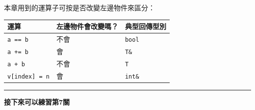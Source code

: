 \documentclass[12pt,a4paper]{article}
\newcommand{\practice}[1]{%
  \Needspace{3\baselineskip}%
  \par\vspace{0.6em}\noindent\rule{\linewidth}{0.3pt}\par
  \noindent\textbf{接下來可以練習第#1關}\par
}
\begin{document}
本章用到的運算子可按是否改變左邊物件來區分：

\begin{center}
\begin{tabular}{lll}
\toprule
運算 & 左邊物件會改變嗎？ & 典型回傳型別 \\
\midrule
\texttt{a == b} & 不會 & \texttt{bool} \\
\texttt{a += b} & 會 & \texttt{T\&} \\
\texttt{a + b} & 不會 & \texttt{T} \\
\texttt{v[index] = n} & 會 & \texttt{int\&} \\
\bottomrule
\end{tabular}
\end{center}

\practice{7}
\end{document}
